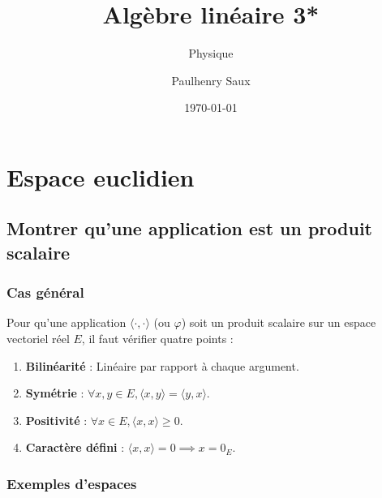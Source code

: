 \documentclass[french]{yLectureNote}
\title{Algèbre linéaire 3*}
\subtitle{Physique}
\author{Paulhenry Saux}
\date{\today}
\begin{document}
\chapter{Espace euclidien}

\section{Montrer qu'une application est un produit scalaire}
\subsection{Cas général}
Pour qu'une application $\langle \cdot, \cdot \rangle$ (ou $\varphi$) soit un produit scalaire sur un espace vectoriel réel $E$, il faut vérifier quatre points :
\begin{enumerate}
    \item \textbf{Bilinéarité} : Linéaire par rapport à chaque argument.
    \item \textbf{Symétrie} : $\forall x, y \in E, \langle x, y \rangle = \langle y, x \rangle$.
    \item \textbf{Positivité} : $\forall x \in E, \langle x, x \rangle \geq 0$.
    \item \textbf{Caractère défini} : $\langle x, x \rangle = 0 \implies x = 0_E$.
\end{enumerate}

\subsection{Exemples d'espaces}
\end{document}
